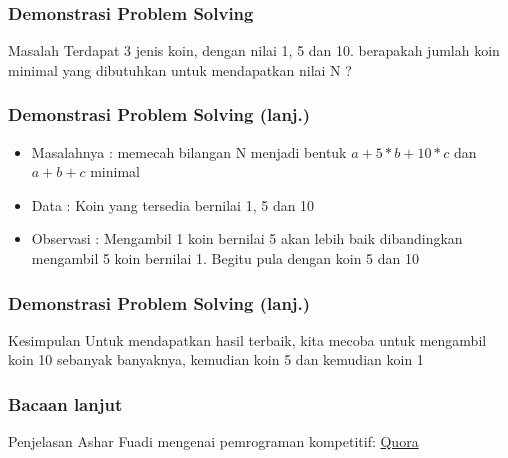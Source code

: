 \begin{frame}
\frametitle{Demonstrasi Problem Solving}
\begin{block}{Masalah}
Terdapat 3 jenis koin, dengan nilai 1, 5 dan 10.
berapakah jumlah koin minimal yang dibutuhkan untuk mendapatkan nilai N ?
\end{block}
\end{frame}

\begin{frame}
\frametitle{Demonstrasi Problem Solving (lanj.)}
\begin{itemize}
  \item Masalahnya : memecah bilangan N menjadi bentuk $a + 5 * b + 10 * c$ dan $a + b + c$ minimal
  \item Data : Koin yang tersedia bernilai 1, 5 dan 10
  \item Observasi : Mengambil 1 koin bernilai 5 akan lebih baik dibandingkan mengambil 5 koin bernilai 1. Begitu pula dengan koin 5 dan 10
\end{itemize}
\end{frame}

\begin{frame}
\frametitle{Demonstrasi Problem Solving (lanj.)}
\begin{block}{Kesimpulan}
Untuk mendapatkan hasil terbaik, kita mecoba untuk mengambil koin 10 sebanyak banyaknya, kemudian koin 5 dan kemudian koin 1
\end{block}
\end{frame}

\begin{frame}
\frametitle{Bacaan lanjut}
  Penjelasan Ashar Fuadi mengenai pemrograman kompetitif: \textcolor{blue}{\href{https://www.quora.com/What-is-competitive-programming-2/answer/Ashar-Fuadi}{Quora}}
\end{frame}


